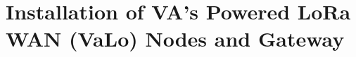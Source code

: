 \documentclass[12pt]{article}
\begin{document}




\section{Installation of VA's Powered LoRa WAN (VaLo) Nodes and Gateway}
\end{document}

